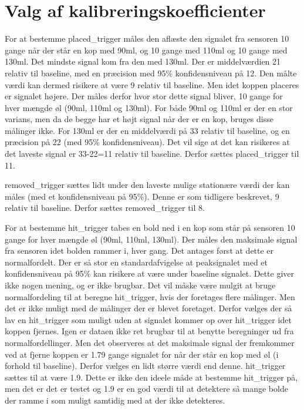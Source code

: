 \documentclass[Softwaredesign/Softwaredesign_main.tex]{subfiles}
\begin{document}
\section{Valg af kalibreringskoefficienter}
For at bestemme placed_trigger måles den aflæste den signalet fra sensoren 10 gange når der står en kop med 90ml, og 10 gange med 110ml og 10 gange med 130ml.
Det mindste signal kom fra den med 130ml.
Der er middelværdien 21 relativ til baseline, med en præcision med 95\% konfidensniveau på 12. Den målte værdi kan dermed risikere at være 9 relativ til baseline. Men idet koppen placeres er signalet højere. Der måles derfor hvor stor dette signal bliver, 10 gange for hver mængde øl (90ml, 110ml og 130ml). For både 90ml og 110ml er der en stor varians, men da de begge har et højt signal når der er en kop, bruges disse målinger ikke. For 130ml er der en middelværdi på 33 relativ til baseline, og en præcision på 22 (med 95\% konfidensniveau). Det vil sige at det kan risikeres at det laveste signal er 33-22=11 relativ til baseline. Derfor sættes placed_trigger til 11. 

removed_trigger sættes lidt under den laveste mulige stationære værdi der kan måles (med et konfidensniveau på 95\%). Denne er som tidligere beskrevet, 9 relativ til baseline. Derfor sættes removed_trigger til 8.

For at bestemme hit_trigger tabes en bold ned i en kop som står på sensoren 10 gange for hver mængde øl (90ml, 110ml, 130ml). Der måles den maksimale signal fra sensoren idet bolden rammer i, hver gang. Det antages først at dette er normalfordelt. Der er så stor en standardafvigelse at peaksignalet med et konfidensniveau på 95\% kan risikere at være under baseline signalet. Dette giver ikke nogen mening, og er ikke brugbar. Det vil måske være mulgit at bruge normalfordeling til at beregne hit_trigger, hvis der foretages flere målinger. Men det er ikke muligt med de målinger der er blevet foretaget. Derfor vælges der så lav en hit_trigger som muligt uden at signalet kommer op over hit_trigger idet koppen fjernes. Igen er dataen ikke ret brugbar til at benytte beregninger ud fra normalfordellinger. Men det observeres at det maksimale signal der fremkommer ved at fjerne koppen er 1.79 gange signalet for når der står en kop med øl (i forhold til baseline).
Derfor vælges en lidt større værdi end denne. hit_trigger sættes til at være 1.9. Dette er ikke den ideele måde at bestemme hit_trigger på, men det er det er testet og 1.9 er en god værdi til at detektere så mange bolde der ramme i som muligt samtidig med at der ikke detekteres.
\end{document}
